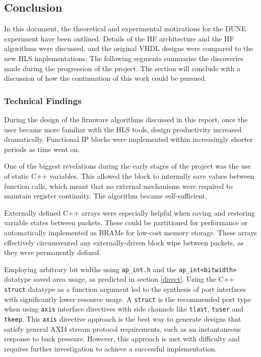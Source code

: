\documentclass[10pt]{article}
\begin{document}
\subsection{Conclusion} \label{conclusion}

In this document, the theoretical and experimental motivations for the DUNE experiment have been outlined. Details of the HF architecture and the HF algorithms were discussed, and the original VHDL designs were compared to the new HLS implementations. The following segments summarise the discoveries made during the progression of the project. The section will conclude with a discussion of how the continuation of this work could be pursued.

\subsubsection{Technical Findings}

During the design of the firmware algorithms discussed in this report, once the user became more familiar with the HLS tools, design productivity increased dramatically. Functional IP blocks were implemented within increasingly shorter periods as time went on. 

One of the biggest revelations during the early stages of the project was the use of static C++ variables. This allowed the block to internally save values between function calls, which meant that no external mechanisms were required to maintain register continuity. The algorithm became self-sufficient.

Externally defined C++ arrays were especially helpful when saving and restoring variable states between packets. These could be partitioned for performance or automatically implemented as BRAMs for low-cost memory storage. These arrays effectively circumvented any externally-driven block wipe between packets, as they were permanently defined. 

Employing arbitrary bit widths using \texttt{ap\_int.h} and the \texttt{ap\_int<bitwidth>} datatype saved area usage, as predicted in section \ref{direct}. Using the C++ \texttt{struct} datatype as a function argument led to the synthesis of port interfaces with significantly lower resource usage. A \texttt{struct} is the recommended port type when using \texttt{axis} interface directives with side channels like \texttt{tlast}, \texttt{tuser} and \texttt{tkeep}. This \texttt{axis} directive approach is the best way to generate designs that satisfy general AXI4 stream protocol requirements, such as an instantaneous response to back pressure. However, this approach is met with difficulty and requires further investigation to achieve a successful implementation.
\end{document}
